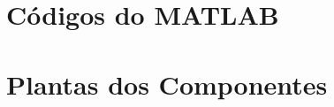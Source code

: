 \begin{anexosenv}

\partanexos

\chapter{Códigos do MATLAB}


    
\chapter{Plantas dos Componentes}



\end{anexosenv}

